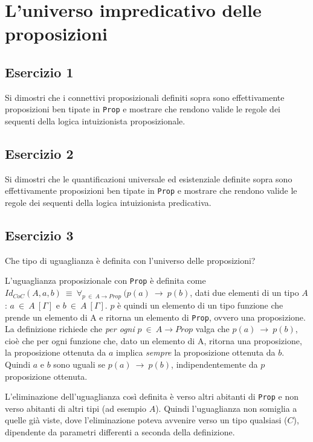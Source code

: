 \section{L'universo impredicativo delle proposizioni}
\subsection{Esercizio 1}
\begin{thm}
	Si dimostri che i connettivi proposizionali definiti sopra sono effettivamente proposizioni ben tipate in \texttt{Prop} e mostrare che rendono valide le regole dei sequenti della logica intuizionista proposizionale.
\end{thm}


\subsection{Esercizio 2}
\begin{thm}
	Si dimostri che le quantificazioni universale ed esistenziale definite sopra sono effettivamente proposizioni ben tipate in \texttt{Prop} e mostrare che rendono valide le regole dei sequenti della logica intuizionista predicativa.
\end{thm}


\subsection{Esercizio 3}
\begin{thm}
	Che tipo di uguaglianza è definita con l'universo delle proposizioni?
\end{thm}
L'uguaglianza proposizionale con \texttt{Prop} è definita come $Id_{CoC}(A,a,b)~\equiv~\forall_{p~\in~A\to Prop}~(p(a)~\to~p(b)$, dati due  elementi di un tipo $A$: $a~\in~A~[\Gamma]$ e $b~\in~A~[\Gamma]$. $p$ è quindi un elemento di un tipo funzione che prende un elemento di A e ritorna un elemento di \texttt{Prop}, ovvero una proposizione. La definizione richiede che \textit{per ogni} $p~\in~A\to Prop$ valga che $p(a)~\to~p(b)$, cioè che per ogni funzione che, dato un elemento di A, ritorna una proposizione, la proposizione ottenuta da $a$ implica \textit{sempre} la proposizione ottenuta da $b$. Quindi $a$ e $b$ sono uguali se $p(a)~\to~p(b)$, indipendentemente da $p$ proposizione ottenuta.

L'eliminazione dell'uguaglianza così definita è verso altri abitanti di \texttt{Prop} e non verso abitanti di altri tipi (ad esempio $A$). Quindi l'uguaglianza non somiglia a quelle già viste, dove l'eliminazione poteva avvenire verso un tipo qualsiasi ($C$), dipendente da parametri differenti a seconda della definizione.

